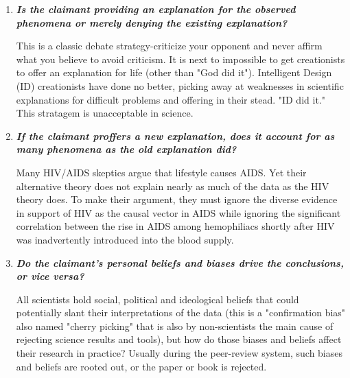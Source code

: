 \begin{enumerate}
		\item \textit{\textbf{Is the claimant providing an explanation for the observed phenomena or merely 
             denying the existing explanation?}}
	
		This is a classic debate strategy-criticize your opponent and never affirm what you believe to avoid criticism. It is next to impossible to get creationists to offer an explanation for life (other than "God did it"). Intelligent Design (ID) creationists have done no better, picking away at weaknesses in scientific explanations for difficult problems and offering in their stead. "ID did it." This stratagem is unacceptable in science.

		\item \textit{\textbf{If the claimant proffers a new explanation, does it account for as many phenomena as the old explanation did?}}
	
		Many HIV/AIDS skeptics argue that lifestyle causes AIDS. Yet their alternative theory does not explain nearly as much of the data as the HIV theory does. To make their argument, they must ignore the diverse evidence in support of HIV as the causal vector in AIDS while ignoring the significant correlation between the rise in AIDS among hemophiliacs shortly after HIV was inadvertently introduced into the blood supply.

		\item \textit{\textbf{Do the claimant's personal beliefs and biases drive the conclusions, or vice versa?}}

		All scientists hold social, political and ideological beliefs that could potentially slant their interpretations of the data (this is a "confirmation bias" also named "cherry picking" that is also by non-scientists the main cause of rejecting science results and tools), but how do those biases and beliefs affect their research in practice? Usually during the peer-review system, such biases and beliefs are rooted out, or the paper or book is rejected.  
	\end{enumerate}
	
